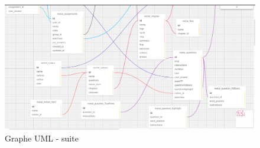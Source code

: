 \documentclass[12pt]{article}
\begin{document}
\begin{figure}
    \centering
    \includegraphics[scale=0.27]{uml2.png}
    \caption{Graphe UML - suite}
    \label{fig:UML2}
\end{figure}

\newpage

\end{document}
